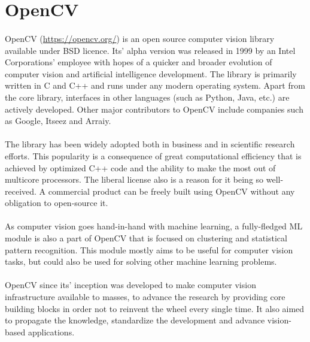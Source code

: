  
\lstset{style=mystyle}

\section{OpenCV}\label{sec:opencv}
\paragraph{}
OpenCV (\url{https://opencv.org/}) is an open source computer vision library available under BSD licence. Its' alpha version was released in 1999 by an Intel Corporations' employee with hopes of a quicker and broader evolution of computer vision and artificial intelligence development. The library is primarily written in C and C++ and runs under any modern operating system. Apart from the core library, interfaces in other languages (such as Python, Java, etc.) are actively developed. Other major contributors to OpenCV include companies such as Google, Itseez and Arraiy.\cite{learning-opencv-3}
\paragraph{}
The library has been widely adopted both in business and in scientific research efforts. This popularity is a consequence of great computational efficiency that is achieved by optimized C++ code and the ability to make the most out of multicore processors. The liberal license also is a reason for it being so well-received. A commercial product can be freely built using OpenCV without any obligation to open-source it.
\paragraph{}
As computer vision goes hand-in-hand with machine learning, a fully-fledged ML module is also a part of OpenCV that is focused on clustering and statistical pattern recognition. This module mostly aims to be useful for computer vision tasks, but could also be used for solving other machine learning problems.
\paragraph{}
OpenCV since its' inception was developed to make computer vision infrastructure available to masses, to advance the research by providing core building blocks in order not to reinvent the wheel every single time. It also aimed to propagate the knowledge, standardize the development and advance vision-based applications. 

